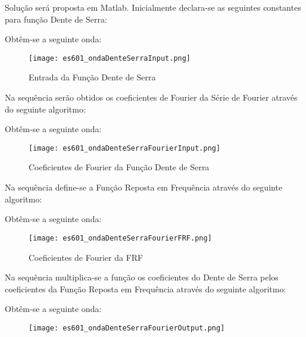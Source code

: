 \documentclass{article}
\begin{document}
\newpage
    \begin{resolution}
        Solução será proposta em Matlab. Inicialmente declara-se as seguintes constantes para função Dente de Serra:
        \begin{scriptsize}
            \myOctave
        \end{scriptsize}
        Obtêm-se a seguinte onda:
        \begin{figure}[H]
            \centering
            \texttt{[image: es601\_ondaDenteSerraInput.png]}
            \caption{Entrada da Função Dente de Serra}
        \end{figure}
\newpage
        Na sequência serão obtidos os coeficientes de Fourier da Série de Fourier através do seguinte algoritmo:
        \begin{scriptsize}
            \myOctave
        \end{scriptsize}
        Obtêm-se a seguinte onda:
        \begin{figure}[H]
            \centering
            \texttt{[image: es601\_ondaDenteSerraFourierInput.png]}
            \caption{Coeficientes de Fourier da Função Dente de Serra}
        \end{figure}
\newpage
        Na sequência define-se a Função Reposta em Frequência através do seguinte algoritmo:
        \begin{scriptsize}
            \myOctave
        \end{scriptsize}
        Obtêm-se a seguinte onda:
        \begin{figure}[H]
            \centering
            \texttt{[image: es601\_ondaDenteSerraFourierFRF.png]}
            \caption{Coeficientes de Fourier da FRF}
        \end{figure}
\newpage
        Na sequência multiplica-se a função os coeficientes do Dente de Serra pelos coeficientes da Função Reposta em Frequência através do seguinte algoritmo:
        \begin{scriptsize}
            \myOctave
        \end{scriptsize}
        Obtêm-se a seguinte onda:
        \begin{figure}[H]
            \centering
            \texttt{[image: es601\_ondaDenteSerraFourierOutput.png]}

\end{figure}
\end{resolution}
\end{document}
